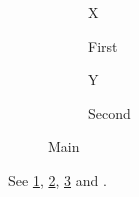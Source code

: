 \documentclass{article}
\begin{document}
\begin{figure}
\begin{subfigure}{0.4\textwidth}X\caption{First}\label{a}\end{subfigure}
\begin{subfigure}{0.4\textwidth}Y\caption{Second}\label{b}\end{subfigure}
\caption{Main}\label{m}
\end{figure}
\setcounter{algorithm}{2}\setcounter{subalgorithm}{1}
See \ref{a}, \ref{b}, \ref{m} and \thesubalgorithm.
\end{document}
